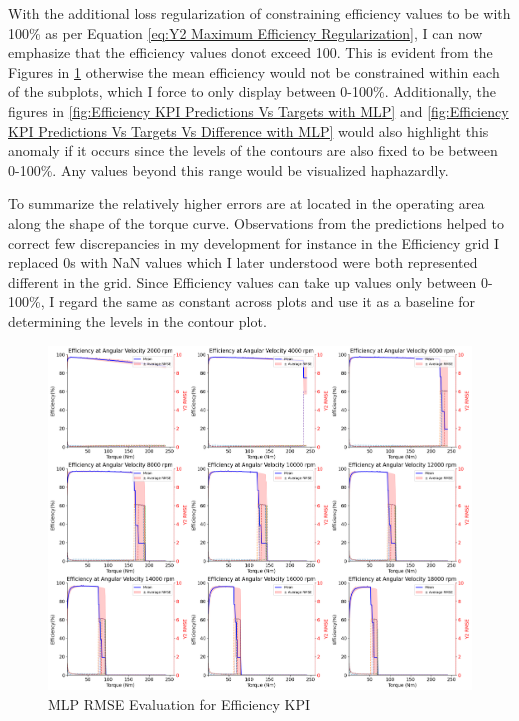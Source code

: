 \documentclass{report} %
\begin{document}
With the additional loss regularization of constraining efficiency values to be with 100\% as per Equation \ref{eq:Y2 Maximum Efficiency Regularization}, I can now emphasize 
that the efficiency values donot exceed 100. This is evident from the Figures in \ref{fig:MLP RMSE Evaluation for Efficiency KPI} otherwise the mean efficiency would not be constrained 
within each of the subplots, which I force to only display between 0-100\%. Additionally, the figures in \ref{fig:Efficiency KPI Predictions Vs Targets with MLP} and 
\ref{fig:Efficiency KPI Predictions Vs Targets Vs Difference with MLP} would also highlight this anomaly if it occurs since the levels of the contours are also fixed to 
be between 0-100\%. Any values beyond this range would be visualized haphazardly.

To summarize the relatively higher errors are at located in the operating area along the shape of the torque curve.
Observations from the predictions helped to correct few discrepancies in my development for instance in the Efficiency grid I replaced 0s with \ac{NaN} values which 
I later understood were both represented different in the grid. Since Efficiency values can take up values only between 0-100\%, I regard the same as constant 
across plots and use it as a baseline for determining the levels in the contour plot.

\begin{figure}[H]
    \centering
    \includegraphics[width=1\textwidth]{./ReportImages/rmse_eta_MLP.png} 
    \caption{\ac{MLP} \ac{RMSE} Evaluation for Efficiency \ac{KPI}} 
    \label{fig:MLP RMSE Evaluation for Efficiency KPI}
\end{figure}
\end{document}
